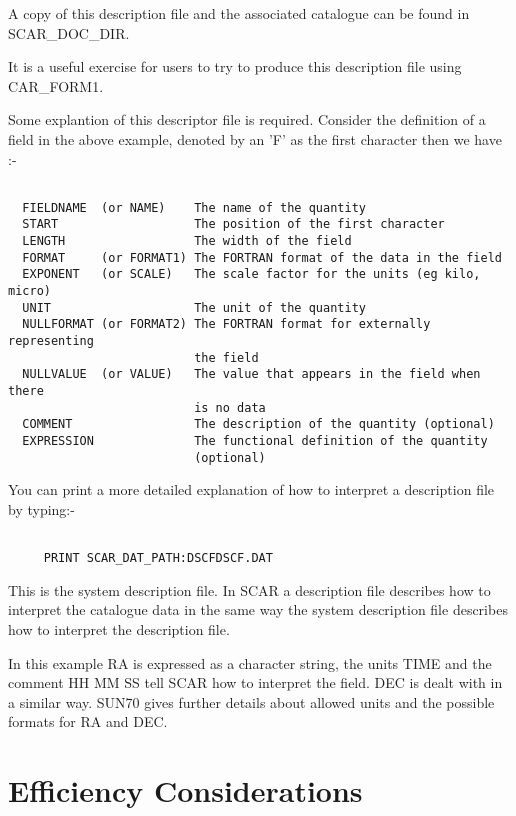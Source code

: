 A copy of this description file and the associated catalogue can be found in
SCAR\_DOC\_DIR.

It is a useful exercise for users to try to produce this description file using 
CAR\_FORM1.

Some explantion of this descriptor file is required. Consider the definition
of a field in the above example, denoted by an 'F' as the first character then
we have :-

\begin{verbatim} 

  FIELDNAME  (or NAME)    The name of the quantity
  START                   The position of the first character
  LENGTH                  The width of the field
  FORMAT     (or FORMAT1) The FORTRAN format of the data in the field
  EXPONENT   (or SCALE)   The scale factor for the units (eg kilo, micro)
  UNIT                    The unit of the quantity
  NULLFORMAT (or FORMAT2) The FORTRAN format for externally representing
                          the field
  NULLVALUE  (or VALUE)   The value that appears in the field when there
                          is no data
  COMMENT                 The description of the quantity (optional)
  EXPRESSION              The functional definition of the quantity
                          (optional)
\end{verbatim}

You can print a more detailed explanation of how to interpret a description 
file by typing:-

\begin {verbatim}

     PRINT SCAR_DAT_PATH:DSCFDSCF.DAT

\end{verbatim}

This is the system description file.
In SCAR a description
file describes how to interpret the catalogue data in the same way the 
system description file describes how to interpret the description file.

In this example RA is 
expressed as a character string, the units TIME and the comment HH MM SS tell 
SCAR how to interpret the field. DEC is dealt with in a similar way. SUN70 gives
further details about allowed units and the possible formats for RA and DEC.

\section{Efficiency Considerations}

